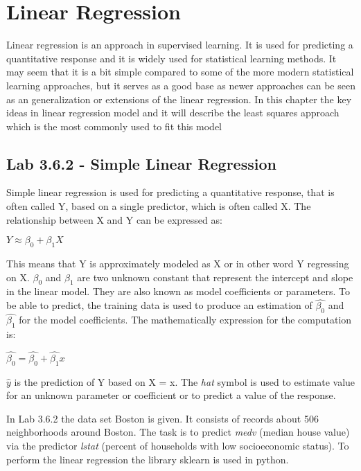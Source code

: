 \chapter{Linear Regression}
\label{chp:linreg}

Linear regression is an approach in supervised learning. It is used for predicting a quantitative response and it is widely used for statistical learning methods. It may seem that it is a bit simple compared to some of the more modern statistical learning approaches, but it serves as a good base as newer approaches can be seen as an generalization or extensions of the linear regression. 
In this chapter the key ideas in linear regression model and it will describe the least squares approach
which is the most commonly used to fit this model

\section{Lab 3.6.2 - Simple Linear Regression}

Simple linear regression is used for predicting a quantitative response, that is often called Y, based on a single predictor, which is often called X.
The relationship between X and Y can be expressed as:

\begin{center}
	$Y \approx \beta_0 + \beta_1X$
\end{center}

This means that Y is approximately modeled as X or in other word Y regressing on X. 
$\beta_0$ and $\beta_1$ are two unknown constant that represent the intercept and slope in the linear model. They are also known as model coefficients or parameters. 
To be able to predict, the training data is used to produce
an estimation of $\hat{\beta_0}$ and $\hat{\beta_1}$ for the model coefficients. 
The mathematically expression for the computation is:

\begin{center}
	$\hat{\beta_0} = \hat{\beta_0} + \hat{\beta_1}x$
\end{center}

$\hat{y}$ is the prediction of Y based on X = x. The \textit{hat} symbol is used to estimate value for an unknown parameter or coefficient or to predict a value of the response.

\newline
In Lab 3.6.2 the data set Boston is given. It consists of records about 506 neighborhoods around Boston. The task is to predict \emph{medv} (median house  value) via the predictor \emph{lstat} (percent of households with low socioeconomic status).
To perform the linear regression the library sklearn is used in python. 

